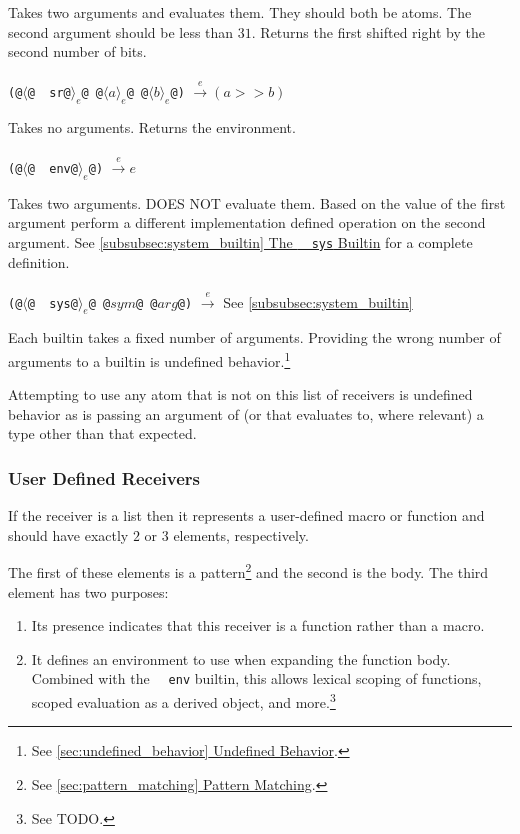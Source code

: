 \documentclass[twocolumn]{report}
\newcommand{\intralink}[2]{\hyperref[#1]{\ref*{#1} #2}}
\begin{document}
\begin{description}[leftmargin=1.5cm,labelwidth=1.3cm]
\item [\texttt{~~sr}]
Takes two arguments and evaluates them.
They should both be atoms.
The second argument should be less than $31$.
Returns the first shifted right by the second number of bits. \\
\\
\texttt{(@$\langle$@~~sr@$\rangle_{e}$@ @$\langle a \rangle_{e}$@ @$\langle b \rangle_{e}$@)} $\xrightarrow{e} (a >> b)$

\item [\texttt{~~env}]
Takes no arguments.
Returns the environment. \\
\\
\texttt{(@$\langle$@~~env@$\rangle_{e}$@)} $\xrightarrow{e} e$

\item [\texttt{~~sys}]
Takes two arguments.
DOES NOT evaluate them.
Based on the value of the first argument perform a different implementation defined operation on the second argument.
See \intralink{subsubsec:system_builtin}{The \texttt{~~sys} Builtin} for a complete definition. \\
\\
\texttt{(@$\langle$@~~sys@$\rangle_{e}$@ @$sym$@ @$arg$@)} $\xrightarrow{e}$ See \intralink{subsubsec:system_builtin}{}
\end{description}

Each builtin takes a fixed number of arguments.
Providing the wrong number of arguments to a builtin is undefined behavior.\footnote{See \intralink{sec:undefined_behavior}{Undefined Behavior}.}

Attempting to use any atom that is not on this list of receivers is undefined behavior as is passing an argument of (or that evaluates to, where relevant) a type other than that expected.

\subsubsection{User Defined Receivers}
\label{subsubsec:user_defined_recievers}

If the receiver is a list then it represents a user-defined macro or function and should have exactly $2$ or $3$ elements, respectively.

The first of these elements is a pattern\footnote{See \intralink{sec:pattern_matching}{Pattern Matching}.} and the second is the body.
The third element has two purposes:
\begin{enumerate}
\item Its presence indicates that this receiver is a function rather than a macro.
\item It defines an environment to use when expanding the function body.
Combined with the \texttt{~~env} builtin, this allows lexical scoping of functions, scoped evaluation as a derived object, and more.\footnote{See TODO.}
\end{enumerate}
\end{document}
